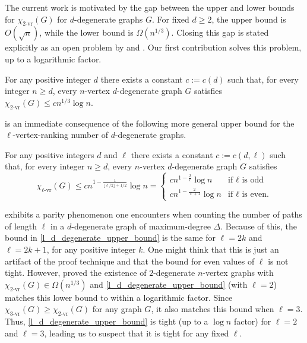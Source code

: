 \documentclass{patmorin}
\newcommand{\rn}[1]{\chi_{\operatorname{#1-vr}}}
\newcommand{\trn}{\chi_{\mathrm{us}}}
\newcommand{\lrn}{\rn{\ell}}
\newcommand{\dexp}{1-\frac{1}{\lfloor\ell/2\rfloor+1/2}}
\begin{document}
The current work is motivated by the gap between the upper and lower bounds for $\rn{2}(G)$ for $d$-degenerate graphs $G$. For fixed $d\ge 2$, the upper bound is $O(\sqrt{n})$, while the lower bound is $\Omega(n^{1/3})$. Closing this gap is stated explicitly as an open problem by \citet{karpas.neiman.ea:on} and \citet{bose.dujmovic.ea:asymptotically}. Our first contribution solves
this problem, up to a logarithmic factor.

\begin{thm}\label{unique_superior}
  For any positive integer $d$ there exists a constant $c:=c(d)$ such that, for every integer $n\ge d$, every $n$-vertex $d$-degenerate graph $G$ satisfies $\rn{2}(G)\le cn^{1/3}\log n$.
\end{thm}

 is an immediate consequence of the following more general upper bound for the $\ell$-vertex-ranking number of $d$-degenerate graphs.

\begin{thm}\label{l_d_degenerate_upper_bound}
  For any positive integers $d$ and $\ell$ there exists a constant $c:=c(d,\ell)$ such that, for every integer $n\ge d$, every $n$-vertex $d$-degenerate graph $G$ satisfies
  \[
    \lrn(G)\le c n^{\dexp}\log n
    = \begin{cases}
      cn^{1-\frac{2}{\ell}}\log n & \text{if $\ell$ is odd} \\
      cn^{1-\frac{2}{\ell+1}}\log n & \text{if $\ell$ is even.}
      \end{cases}
  \]
\end{thm}
 exhibits a parity phenomenon one encounters when counting the number of paths of length $\ell$ in a $d$-degenerate graph of maximum-degree $\Delta$. Because of this, the bound in \cref{l_d_degenerate_upper_bound} is the same for $\ell=2k$ and $\ell=2k+1$, for any positive integer $k$.  One might think that this is just an artifact of the proof technique and that the bound for even values of $\ell$ is not tight.  However, \citet{karpas.neiman.ea:on} proved the existence of $2$-degenerate $n$-vertex graphs with $\rn{2}(G)\in\Omega(n^{1/3})$ and \cref{l_d_degenerate_upper_bound} (with $\ell=2$) matches this lower bound to within a logarithmic factor.  Since $\rn{3}(G)\ge\rn{2}(G)$ for any graph $G$, it also matches this bound when $\ell=3$.  Thus, \cref{l_d_degenerate_upper_bound} is tight (up to a $\log n$ factor) for $\ell=2$ and $\ell=3$, leading us to suspect that it is tight for any fixed $\ell$.
\end{document}
